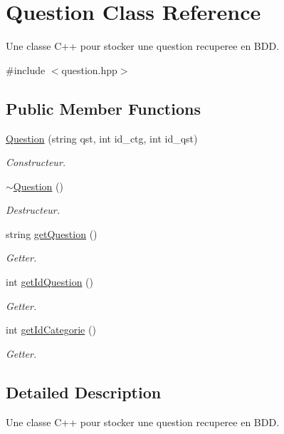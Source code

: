 \hypertarget{classQuestion}{}\section{Question Class Reference}
\label{classQuestion}


Une classe C++ pour stocker une question recuperee en B\+DD.  




{\ttfamily \#include $<$question.\+hpp$>$}

\subsection*{Public Member Functions}
\begin{DoxyCompactItemize}
\item 
\mbox{\hyperlink{classQuestion_a830635ca7810e8504e8043ed6c0cf8c2}{Question}} (string qst, int id\+\_\+ctg, int id\+\_\+qst)
\begin{DoxyCompactList}\small\item\em Constructeur. \end{DoxyCompactList}\item 
\mbox{\hyperlink{classQuestion_a8d9283fb5357e39ed58a743f18629040}{$\sim$\+Question}} ()
\begin{DoxyCompactList}\small\item\em Destructeur. \end{DoxyCompactList}\item 
string \mbox{\hyperlink{classQuestion_a6c5bb67ddc2f5571f710d92764c8dfd7}{get\+Question}} ()
\begin{DoxyCompactList}\small\item\em Getter. \end{DoxyCompactList}\item 
int \mbox{\hyperlink{classQuestion_afeffea1a16f2da6bc8d17414596a5d4e}{get\+Id\+Question}} ()
\begin{DoxyCompactList}\small\item\em Getter. \end{DoxyCompactList}\item 
int \mbox{\hyperlink{classQuestion_a1838d7b5fe4055ae28671fe49824008a}{get\+Id\+Categorie}} ()
\begin{DoxyCompactList}\small\item\em Getter. \end{DoxyCompactList}\end{DoxyCompactItemize}


\subsection{Detailed Description}
Une classe C++ pour stocker une question recuperee en B\+DD. 

